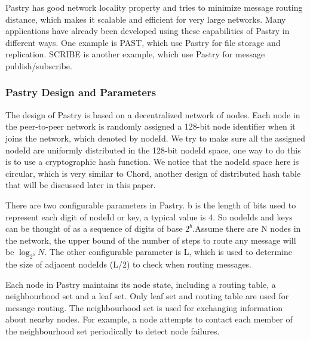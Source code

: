 \documentclass[11pt,a4paper]{article}
\begin{document}
    Pastry has good network locality property and tries to minimize message routing distance, which makes it scalable and efficient for very large networks. Many applications have already been developed using these capabilities of Pastry in different ways. One example is PAST, which use Pastry for file storage and replication. SCRIBE is another example, which use Pastry for message publish/subscribe.
    
    \subsubsection{Pastry Design and Parameters}
    
    The design of Pastry is based on a decentralized network of nodes. Each node in the peer-to-peer network is randomly assigned a 128-bit node identifier when it joins the network, which denoted by nodeId. We try to make sure all the assigned nodeId are uniformly distributed in the 128-bit nodeId space, one way to do this is to use a cryptographic hash function. We notice that the nodeId space here is circular, which is very similar to Chord, another design of distributed hash table that will be discussed later in this paper.
    
    There are two configurable parameters in Pastry. b is the length of bits used to represent each digit of nodeId or key, a typical value is 4. So nodeIds and keys can be thought of as a sequence of digits of base \(2^{b}\).Assume there are N nodes in the network, the upper bound of the number of steps to route any message will be \(\log_{2^b} N \). The other configurable parameter is L, which is used to determine the size of adjacent nodeIds (L/2) to check when routing messages.
    
    Each node in Pastry maintains its node state, including a routing table, a neighbourhood set and a leaf set. Only leaf set and routing table are used for message routing. The neighbourhood set is used for exchanging information about nearby nodes. For example, a node attempts to contact each member of the neighbourhood set periodically to detect node failures. 
    
\end{document}
